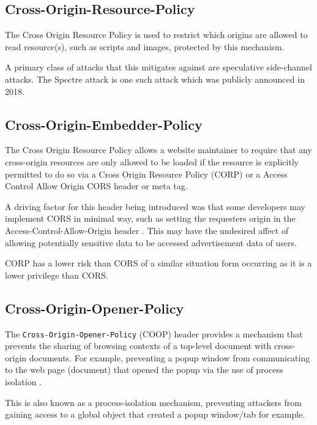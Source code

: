 \documentclass{mscreport}
\begin{document}
\subsection{Cross-Origin-Resource-Policy}
The Cross Origin Resource Policy is used to restrict which origins are allowed to read resource(s), such as scripts and images, protected by this mechanism.

\vspace{0.3cm} \noindent
A primary class of attacks that this mitigates against are speculative side-channel attacks. The Spectre attack \cite{Kocher2019-gv} is one such attack which was publicly announced in 2018.


\subsection{Cross-Origin-Embedder-Policy}
The Cross Origin Resource Policy allows a website maintainer to require that any cross-origin resources are only allowed to be loaded if the resource is explicitly permitted to do so via a Cross Origin Resource Policy (CORP) or a Access Control Allow Origin CORS header or meta tag.

\vspace{0.3cm} \noindent
A driving factor for this header being introduced was that some developers may implement CORS in minimal way, such as setting the requesters origin in the Access-Control-Allow-Origin header \cite{noauthor_undated-cr}. This may have the undesired affect of allowing potentially sensitive data to be accessed advertisement data of users.

\vspace{0.3cm} \noindent
CORP has a lower risk than CORS of a similar situation form occurring as it is a lower privilege than CORS.


\subsection{Cross-Origin-Opener-Policy}
The \texttt{Cross-Origin-Opener-Policy} (COOP) header provides a mechanism that prevents the sharing of browsing contexts of a top-level document with cross-origin documents. For example, preventing a popup window from communicating to the web page (document) that opened the popup via the use of process isolation \cite{Apple_undated-gj}.

\vspace{0.3cm} \noindent
This is also known as a process-isolation mechanism, preventing attackers from gaining access to a global object that created a popup window/tab for example.
\end{document}
